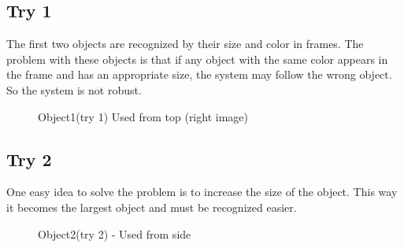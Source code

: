 \documentclass{report}
\begin{document}
\subsection{Try 1}
The first two objects are recognized by their size and color in frames. The problem with these objects is that if any object with the same color appears in the frame and has an appropriate size, the system may follow the wrong object. So the system is not robust.

\begin{figure}
\caption{Object1(try 1) Used from top (right image)} 	
\end{figure}

\subsection{Try 2}
One easy idea to solve the problem is to increase the size of the object. This way it becomes the largest object and must be recognized easier.

\begin{figure}
	\caption{Object2(try 2) - Used from side}  
\end{figure}
\end{document}

